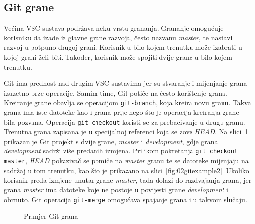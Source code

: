 \subsection{Git grane}
Većina VSC sustava podržava neku vrstu grananja. Grananje omogućuje korisniku da izađe iz glavne
grane razvoja, često nazvanu \textit{master}, te nastavi razvoj u potpuno drugoj grani. Korisnik u
bilo kojem trenutku može izabrati u kojoj grani želi biti. Također, korisnik može spojiti dvije
grane u bilo kojem trenutku.

Git ima prednost nad drugim VSC sustavima jer su stvaranje i mijenjanje grana izuzetno brze
operacije. Samim time, Git potiče na često korištenje grana. Kreiranje grane obavlja se operacijom
\texttt{git-branch}, koja kreira novu granu. Takva grana ima iste datoteke kao i grana prije nego
što je operacija kreiranja grane bila pozvana. Operacija \texttt{git-checkout} koristi se za
prebacivanje u drugu granu. Trenutna grana zapisana je u specijalnoj referenci koja se zove
\textit{HEAD}. Na slici~\ref{fig:02gitexample} prikazan je Git projekt s dvije grane,
\textit{master} i \textit{development}, gdje grana \textit{development} sadrži više predanih
izmjena. Prilikom pokretanja \texttt{git checkout master}, \textit{HEAD} pokazivač se pomiče na
\textit{master} granu te se datoteke mijenjaju na sadržaj u tom trenutku, kao što je prikazano na
slici~\ref{fig:02gitexample2}. Ukoliko korisnik preda izmjene unutar grane \textit{master}, tada
dolazi do razdvajanja grana, jer grana \textit{master} ima datoteke koje ne postoje u povijesti
grane \textit{development} i obrnuto. Git operacija \texttt{git-merge} omogućava spajanje grana i u
takvom slučaju.

\begin{figure}[h]
    \centering

    \caption{Primjer Git grana}%
    \label{fig:02gitexample}
\end{figure}

